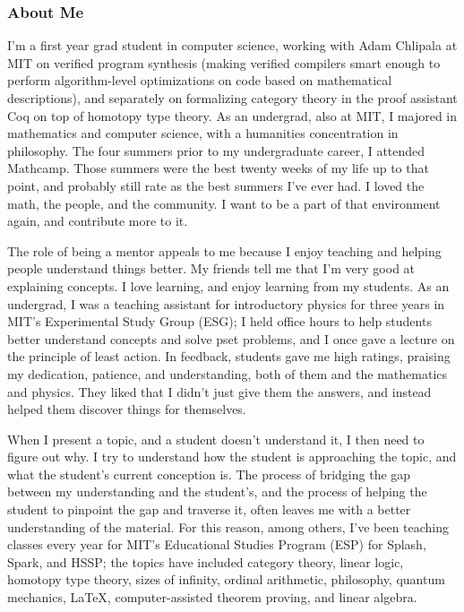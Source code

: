 \documentclass{article}
\begin{document}
\subsubsection*{About Me}
{\setlength{\parindent}{0pt}
\setlength{\parskip}{0.5\baselineskip}
I'm a first year grad student in computer science, working with Adam Chlipala at MIT on verified program synthesis (making verified compilers smart enough to perform algorithm-level optimizations on code based on mathematical descriptions), and separately on formalizing category theory in the proof assistant Coq on top of homotopy type theory.  As an undergrad, also at MIT, I majored in mathematics and computer science, with a humanities concentration in philosophy.  The four summers prior to my undergraduate career, I attended Mathcamp.  Those summers were the best twenty weeks of my life up to that point, and probably still rate as the best summers I've ever had.  I loved the math, the people, and the community.  I want to be a part of that environment again, and contribute more to it.

The role of being a mentor appeals to me because I enjoy teaching and helping people understand things better.  My friends tell me that I'm very good at explaining concepts.  I love learning, and enjoy learning from my students.  As an undergrad, I was a teaching assistant for introductory physics for three years in MIT's Experimental Study Group (ESG); I held office hours to help students better understand concepts and solve pset problems, and I once gave a lecture on the principle of least action.  In feedback, students gave me high ratings, praising my dedication, patience, and understanding, both of them and the mathematics and physics.  They liked that I didn't just give them the answers, and instead helped them discover things for themselves.

When I present a topic, and a student doesn't understand it, I then need to figure out why.  I try to understand how the student is approaching the topic, and what the student's current conception is.  The process of bridging the gap between my understanding and the student's, and the process of helping the student to pinpoint the gap and traverse it, often leaves me with a better understanding of the material.  For this reason, among others, I've been teaching classes every year for MIT's Educational Studies Program (ESP) for Splash, Spark, and HSSP; the topics have included category theory, linear logic, homotopy type theory, sizes of infinity, ordinal arithmetic, philosophy, quantum mechanics, \LaTeX, computer-assisted theorem proving, and linear algebra.

}
\end{document}
